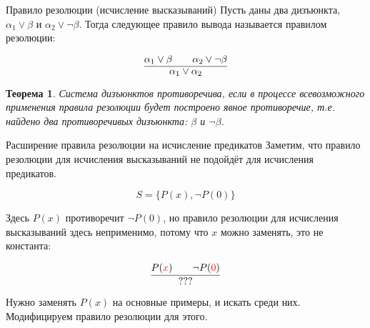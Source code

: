 \documentclass[aspectratio=169]{beamer}
\newtheorem{thm}{Теорема}[section]
\begin{document}

\begin{frame}{Правило резолюции (исчисление высказываний)}
Пусть даны два дизъюнкта, $\alpha_1 \vee \beta$ и $\alpha_2 \vee \neg \beta$.
Тогда следующее правило вывода называется правилом резолюции:

$$\infer{\alpha_1\vee \alpha_2}{\alpha_1\vee \beta\quad\quad \alpha_2\vee\neg \beta}$$

\begin{thm}Система дизъюнктов противоречива, если в процессе всевозможного применения
правила резолюции будет построено явное противоречие,
т.е. найдено два противоречивых дизъюнкта: $\beta$ и $\neg\beta$.
\end{thm}
\end{frame}

\begin{frame}{Расширение правила резолюции на исчисление предикатов}
Заметим, что правило резолюции для исчисления высказываний не подойдёт для исчисления предикатов.

$$S = \{ P(x), \neg P(0)\}$$

Здесь $P(x)$ противоречит $\neg P(0)$, но правило резолюции для исчисления высказываний здесь неприменимо, потому
что $x$ можно заменять, это не константа:

$$\infer{???}{P({\color{red}x})\quad\quad\neg P({\color{red}0})}$$

Нужно заменять $P(x)$ на основные примеры, и искать среди них. Модифицируем правило резолюции для этого.

\end{frame}
\end{document}
